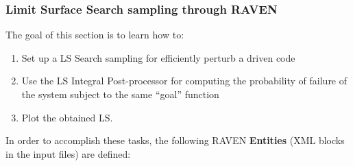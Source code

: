 \subsubsection{Limit Surface Search sampling through RAVEN}
\label{subsub:LSsamplingExample}
The goal of this section is to learn how to:
 \begin{enumerate}
   \item Set up a LS Search sampling for efficiently perturb a driven code
   \item Use the LS Integral Post-processor for computing the probability of failure of the system subject to the same 
   ``goal'' function
   \item Plot the obtained LS.
\end{enumerate}  
In order to accomplish these tasks, the following RAVEN \textbf{Entities} (XML blocks in the input files) are defined:
